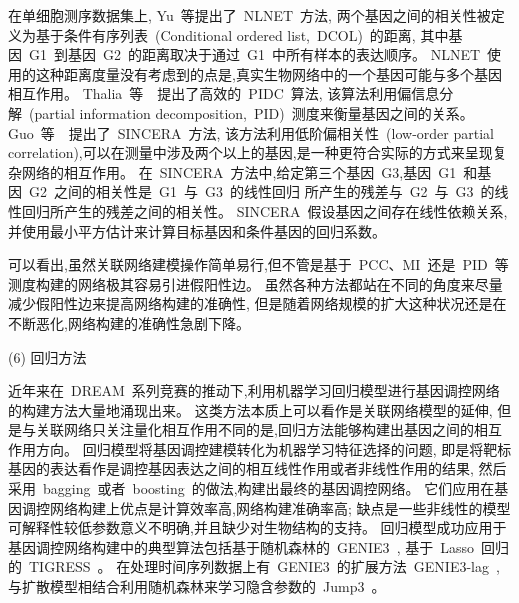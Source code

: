 在单细胞测序数据集上,
Yu~等提出了~NLNET~方法\cite{yu2013hierarchical}, 
两个基因之间的相关性被定义为基于条件有序列表~(Conditional ordered list,~DCOL)~的距离,
其中基因~G1~到基因~G2~的距离取决于通过~G1~中所有样本的表达顺序。
NLNET~使用的这种距离度量没有考虑到的点是,真实生物网络中的一个基因可能与多个基因相互作用。
Thalia~等~\cite{chan2017gene}~提出了高效的~PIDC~算法,
该算法利用偏信息分解~(partial information decomposition,~PID)~测度来衡量基因之间的关系。
Guo~等~\cite{guo2015sincera}~提出了~SINCERA~方法, 该方法利用低阶偏相关性~(low-order partial correlation),可以在测量中涉及两个以上的基因,是一种更符合实际的方式来呈现复杂网络的相互作用。
在~SINCERA~方法中,给定第三个基因~G3,基因~G1~和基因~G2~之间的相关性是~G1~与~G3~的线性回归
所产生的残差与~G2~与~G3~的线性回归所产生的残差之间的相关性。
SINCERA~假设基因之间存在线性依赖关系,并使用最小平方估计来计算目标基因和条件基因的回归系数。

可以看出,虽然关联网络建模操作简单易行,但不管是基于~PCC、MI~还是~PID~等测度构建的网络极其容易引进假阳性边。
虽然各种方法都站在不同的角度来尽量减少假阳性边来提高网络构建的准确性,
但是随着网络规模的扩大这种状况还是在不断恶化,网络构建的准确性急剧下降。

(6) 回归方法

近年来在~DREAM~系列竞赛的推动下,利用机器学习回归模型进行基因调控网络的构建方法大量地涌现出来。
这类方法本质上可以看作是关联网络模型的延伸,
但是与关联网络只关注量化相互作用不同的是,回归方法能够构建出基因之间的相互作用方向。
回归模型将基因调控建模转化为机器学习特征选择的问题,
即是将靶标基因的表达看作是调控基因表达之间的相互线性作用或者非线性作用的结果,
然后采用~bagging~或者~boosting~的做法,构建出最终的基因调控网络。
它们应用在基因调控网络构建上优点是计算效率高,网络构建准确率高;
缺点是一些非线性的模型可解释性较低参数意义不明确,并且缺少对生物结构的支持。
回归模型成功应用于基因调控网络构建中的典型算法包括基于随机森林的~GENIE3~\cite{Huynh-Thu2010},
基于~Lasso~回归的~TIGRESS~\cite{Haury2012}。
在处理时间序列数据上有~GENIE3~的扩展方法~GENIE3-lag~\cite{huynh2012machine},
与扩散模型相结合利用随机森林来学习隐含参数的~Jump3~\cite{Huynh-Thu2014}。

